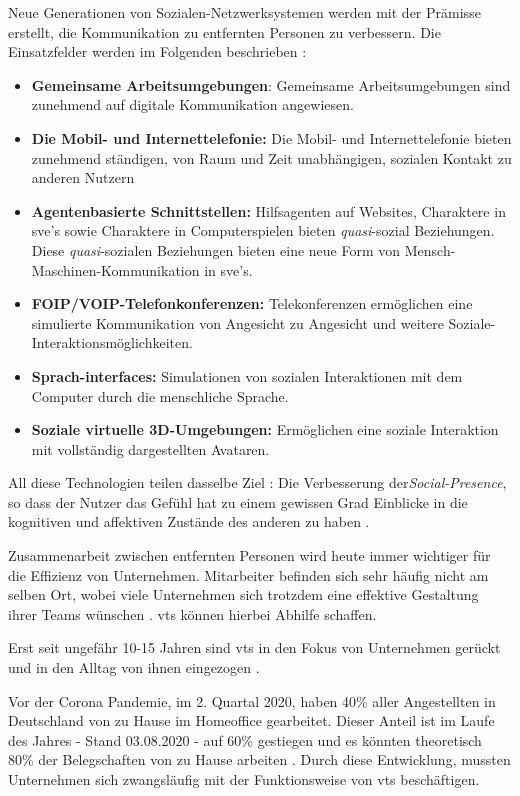 \documentclass[a4paper,11pt]{article}%
\renewcommand{\\}{\vspace*{0.5\baselineskip} \newline}
\begin{document}
Neue Generationen von Sozialen-Netzwerksystemen werden mit der Prämisse erstellt, die Kommunikation zu entfernten Personen zu verbessern.
Die Einsatzfelder werden im Folgenden beschrieben :
\begin{itemize}
	\item{\textbf{Gemeinsame Arbeitsumgebungen}: Gemeinsame Arbeitsumgebungen sind zunehmend auf digitale Kommunikation angewiesen.}
	\item{\textbf{Die Mobil- und Internettelefonie:} Die Mobil- und Internettelefonie bieten zunehmend ständigen, von Raum und Zeit unabhängigen, sozialen Kontakt zu anderen Nutzern}
	\item{\textbf{Agentenbasierte Schnittstellen:} Hilfsagenten auf Websites, Charaktere in \ac{sve}'s sowie Charaktere in Computerspielen bieten \textit{quasi}-sozial Beziehungen. Diese \textit{quasi}-sozialen Beziehungen bieten eine neue Form von Mensch-Maschinen-Kommunikation in \ac{sve}'s.} 
	\item{\textbf{FOIP/VOIP-Telefonkonferenzen:} Telekonferenzen ermöglichen eine simulierte Kommunikation von Angesicht zu Angesicht und weitere Soziale-Interaktionsmöglichkeiten.}
	\item{\textbf{Sprach-interfaces:} Simulationen von sozialen Interaktionen mit dem Computer durch die menschliche Sprache.}
	\item{\textbf{Soziale virtuelle 3D-Umgebungen:} Ermöglichen eine soziale Interaktion mit vollständig dargestellten Avataren.}
\end{itemize}

All diese Technologien teilen dasselbe Ziel : \\ \dq{}Die Verbesserung der\textit{Social-Presence}, so dass der Nutzer das Gefühl hat zu einem gewissen Grad Einblicke in die kognitiven und affektiven Zustände des anderen zu haben \dq{} \citep{biocca2002defining} \citep[p.407–447]{biocca2001plugging}.

Zusammenarbeit zwischen entfernten Personen wird heute immer wichtiger für die Effizienz von Unternehmen. Mitarbeiter befinden sich sehr häufig nicht am selben Ort, wobei viele Unternehmen sich trotzdem eine effektive Gestaltung ihrer Teams wünschen \citep[p.791-792]{jarvenpaa1999communication}. \ac{vts} können hierbei Abhilfe schaffen. 
	
Erst seit ungefähr 10-15 Jahren sind \ac{vts} in den Fokus von Unternehmen gerückt und in den Alltag von ihnen eingezogen \citep{gilson2015virtual}.

Vor der Corona Pandemie, im 2. Quartal 2020, haben 40\% aller Angestellten in Deutschland von zu Hause im \dq{}Homeoffice\dq{} gearbeitet. Dieser Anteil ist im Laufe des Jahres - Stand 03.08.2020 - auf 60\% gestiegen und es könnten theoretisch 80\% der Belegschaften von zu Hause arbeiten \citep{statistaCorona2020}. Durch diese Entwicklung, mussten Unternehmen sich zwangsläufig mit der Funktionsweise von \ac{vts} beschäftigen.
\end{document}
